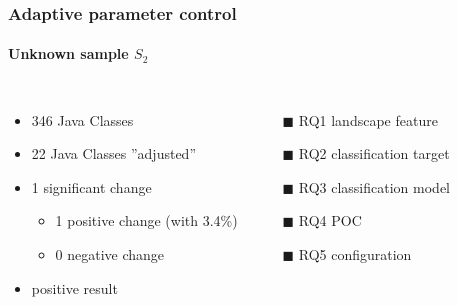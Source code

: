 \begin{frame}
	\frametitle{Adaptive parameter control}
	\framesubtitle{Unknown sample $S_2$}
	
	\begin{columns}[c]
	
	\begin{itemize}
		\item 346 Java Classes
		\item 22 Java Classes ''adjusted''
		\item 1 significant change
		\begin{itemize}
			\item 1 positive change (with 3.4\%)
			\item 0 negative change
		\end{itemize}
		\item positive result
	\end{itemize}
	
		\begin{itemize}
			\item[\textcolor{hni-gray}{$\blacksquare$}] \textcolor{hni-gray}{RQ1 landscape feature \xmark}
			\item[$\blacksquare$] RQ2 classification target \checkmark
			\item[\textcolor{hni-gray}{$\blacksquare$}] \textcolor{hni-gray}{RQ3 classification model \xmark}
			\item[\textcolor{hni-gray}{$\blacksquare$}] \textcolor{hni-gray}{RQ4 POC \xmark}
			\item[$\blacksquare$] RQ5 configuration \checkmark
		\end{itemize}
	
	\end{columns}
	
\end{frame}

